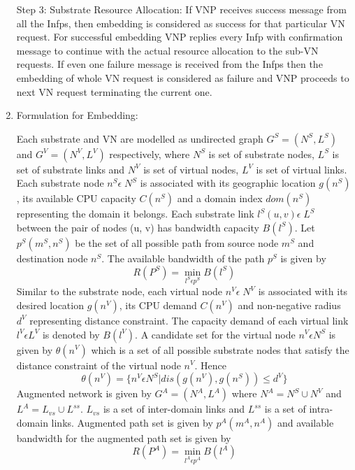 \documentclass[article,dr=phil,type=msc ,colorback,accentcolor=tud4b]{tudthesis}
\begin{document}
\begin{enumerate}[label=(\Alph*)]
Step 3: Substrate Resource Allocation: If VNP receives success message from all the Infps, then embedding is considered as success for that particular VN request. For successful embedding VNP replies every Infp with confirmation message to continue with the actual resource allocation to the sub-VN requests. If even one failure message is received from the Infps then the embedding of whole VN request is considered as failure and VNP proceeds to next VN request terminating the current one.

\item Formulation for Embedding:  
 
 Each substrate and VN are modelled as undirected graph $G^{S} = (N^{S}, L^{S})$ and $G^{V} = (N^{V}, L^{V})$ respectively, where $N^{S}$ is set of substrate nodes, $L^{S}$ is set of substrate links and $N^{V}$ is set of virtual nodes, $L^{V}$ is set of virtual links. Each substrate node $n^{S} \epsilon \; N^{S}$ is associated with its geographic location $g(n^{S})$, its available CPU capacity $C(n^{S})$ and a domain index $dom(n^{S})$ representing the domain it belongs. Each substrate link $l^{S}(u, v) \epsilon \; L^{S}$ between the pair of nodes (u, v) has bandwidth capacity $B(l^{S})$. 
 Let  $p^{S}(m^{S}, n^{S})$ be the set of all possible path from source node $m^{S}$ and destination node $n^{S}$. The available bandwidth of the path $p^{S}$ is given by 
 \begin{equation}
 R(P^{S}) = \min_{l^{S}\epsilon p^{S}}B(l^{S})
  \end{equation} 
Similar to the substrate node, each virtual node $n^{V} \epsilon \; N^{V}$ is associated with its desired location $g(n^{V})$, its CPU demand $C(n^{V})$ and non-negative radius $d^{V}$ representing distance constraint. The capacity demand of each virtual link $l^{V}\epsilon L^{V}$ is denoted by $B(l^{V})$. A candidate set for the virtual node $n^{V} \epsilon N^{S}$ is given by $\theta(n^{V})$ which is a set of all possible substrate nodes that satisfy the distance constraint of the virtual node $n^{V}$. Hence 
\begin{equation}
\theta(n^{V}) = \{n^{V} \epsilon N^{S} | dis(g(n^{V}), g(n^{S})) \leq d^{V}\}
\end{equation}
Augmented network is given by $G^{A} = (N^{A}, L^{A})$ where $N^{A} = N^{S} \cup N^{V}$ and $L^{A} = L_{vs} \cup L^{ss}$. $L_{vs}$ is a set of inter-domain links and $L^{ss}$ is a set of intra-domain links. Augmented path set is given by $p^{A}(m^{A}, n^{A})$ and available bandwidth for the augmented path set is given by 
\begin{equation}
R(P^{A}) = \min_{l^{A}\epsilon p^{A}}B(l^{A})
\end{equation} 


\end{enumerate}
\end{document}
